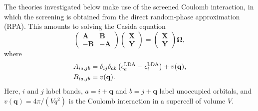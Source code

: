 \documentclass[letterpaper]{article}
\begin{document}
The theories investigated below make use of the screened Coulomb interaction, in which the screening is obtained from the direct random-phase approximation (RPA). This amounts to solving the Casida equation
\begin{equation}
\begin{pmatrix}
\mathbf{A} & \mathbf{B} \\
-\mathbf{B} & -\mathbf{A}
\end{pmatrix}
\begin{pmatrix}
\mathbf{X} \\
\mathbf{Y}
\end{pmatrix}
=
\begin{pmatrix}
\mathbf{X} \\
\mathbf{Y}
\end{pmatrix}
\mathbf{\Omega},
\label{eq:casida}
\end{equation}
where
\begin{align}
    A_{ia,jb} &= \delta_{ij}\delta_{ab} \left(\epsilon_a^{\rm LDA}-\epsilon_i^{\rm LDA}\right) + v(\mathbf{q}),\\
    B_{ia,jb} &= v(\mathbf{q}).
\end{align}
Here, $i$ and $j$ label bands, $a = i + \mathbf{q}$ and $b = j + \mathbf{q}$ label unoccupied orbitals, and $v(\mathbf{q}) = 4\pi/(V q^2)$ is the Coulomb interaction in a supercell of volume $V$.
\end{document}
